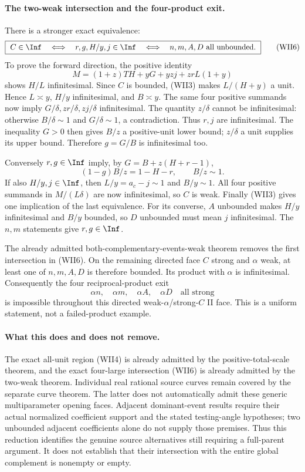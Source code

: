 \paragraph{The two-weak intersection and the four-product exit.}
There is a stronger exact equivalence:
\[
 \boxed{\ C\in\Inf\quad\Longleftrightarrow\quad
 r,g,H/y,j\in\Inf
 \quad\Longleftrightarrow\quad n,m,A,D\text{ all unbounded}.\ }
                                                               \tag{WII6}
\]
To prove the forward direction, the positive identity
\[
 M=(1+z)TH+yG+yzj+zrL(1+y)
\]
shows $H/L$ infinitesimal. Since $C$ is bounded, (WII3) makes
$L/(H+y)$ a unit. Hence $L\asymp y$, $H/y$ infinitesimal, and
$B\asymp y$. The same four positive summands now imply
$G/\delta,zr/\delta,zj/\delta$ infinitesimal. The quantity
$z/\delta$ cannot be infinitesimal: otherwise $B/\delta\sim1$
and $G/\delta\sim1$, a contradiction. Thus $r,j$ are infinitesimal.
The inequality $G>0$ then gives $B/z$ a positive-unit lower bound;
$z/\delta$ a unit supplies its upper bound. Therefore $g=G/B$ is
infinitesimal too.

Conversely $r,g\in\Inf$ imply, by $G=B+z(H+r-1)$,
\[
 (1-g)B/z=1-H-r,\qquad B/z\sim1.
\]
If also $H/y,j\in\Inf$, then $L/y=a_c-j\sim1$ and
$B/y\sim1$. All four positive summands in $M/(L\delta)$ are now
infinitesimal, so $C$ is weak. Finally (WII3) gives one implication
of the last equivalence. For its converse, $A$ unbounded makes
$H/y$ infinitesimal and $B/y$ bounded, so $D$ unbounded must mean
$j$ infinitesimal. The $n,m$ statements give $r,g\in\Inf$.

The already admitted both-complementary-events-weak theorem removes
the first intersection in (WII6). On the remaining directed face
$C$ strong and $\alpha$ weak, at least one of $n,m,A,D$ is therefore
bounded. Its product with $\alpha$ is infinitesimal. Consequently
the four reciprocal-product exit
\[
 \alpha n,\quad\alpha m,\quad\alpha A,\quad\alpha D
 \quad\text{all strong}
\]
is impossible throughout this directed weak-$\alpha$/strong-$C$
II face. This is a uniform statement, not a failed-product example.

\paragraph{What this does and does not remove.}
The exact all-unit region (WII4) is already admitted by the
positive-total-scale theorem, and the exact four-large intersection
(WII6) is already admitted by the two-weak theorem. Individual real
rational source curves remain covered by the separate curve theorem.
The latter does not automatically admit these generic multiparameter
opening faces. Adjacent dominant-event results require their actual
normalized coefficient support and the stated testing-angle hypotheses;
two unbounded adjacent coefficients alone do not supply those premises.
Thus this reduction identifies the genuine source alternatives still
requiring a full-parent argument. It does not establish that their
intersection with the entire global complement is nonempty or empty.
